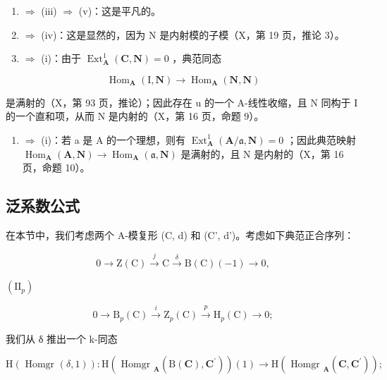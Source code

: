 \begin{enumerate}
\def\labelenumi{(\roman{enumi})}
\setcounter{enumi}{1}
\item
  \(\Rightarrow\) (iii) \(\Rightarrow\) (v)：这是平凡的。
\item
  \(\Rightarrow\) (iv)：这是显然的，因为 N 是内射模的子模（X，第 19 页，推论 3）。
\item
  \(\Rightarrow\) (i)：由于 \(\operatorname{Ext}_{\mathbf{A}}^{1}(\mathbf{C},\mathbf{N}) = 0\) ，典范同态
\end{enumerate}

\[
\operatorname{Hom} _ {\mathbf {A}} (\mathrm{I}, \mathbf {N}) \rightarrow \operatorname{Hom} _ {\mathbf {A}} (\mathbf {N}, \mathbf {N})
\]

是满射的（X，第 93 页，推论）；因此存在 u 的一个 A-线性收缩，且 N 同构于 I 的一个直和项，从而 N 是内射的（X，第 16 页，命题 9）。

\begin{enumerate}
\def\labelenumi{(\alph{enumi})}
\setcounter{enumi}{21}
\tightlist
\item
  \(\Rightarrow\) (i)：若 a 是 A 的一个理想，则有 \(\operatorname{Ext}_{\mathbf{A}}^{1}(\mathbf{A}/\mathfrak{a},\mathbf{N})=0\) ；因此典范映射 \(\operatorname{Hom}_{\mathbf{A}}(\mathbf{A},\mathbf{N})\to\operatorname{Hom}_{\mathbf{A}}(\mathfrak{a},\mathbf{N})\) 是满射的，且 N 是内射的（X，第 16 页，命题 10）。
\end{enumerate}

\subsection{泛系数公式}

在本节中，我们考虑两个 A-模复形 (C, d) 和 (C', d')。考虑如下典范正合序列：

\[
0 \rightarrow \mathrm{Z} (\mathrm{C}) \stackrel {{j}} {{\rightarrow}} \mathrm{C} \stackrel {{\delta}} {{\rightarrow}} \mathrm{B} (\mathrm{C}) (- 1) \rightarrow 0,\tag{I}
\]

\((\mathrm{II}_{p})\)

\[
0 \to \mathrm{B} _ {p} (\mathrm{C}) \stackrel {{i}} {{\to}} \mathrm{Z} _ {p} (\mathrm{C}) \stackrel {{p}} {{\to}} \mathrm{H} _ {p} (\mathrm{C}) \to 0;
\]

我们从 δ 推出一个 k-同态

\[
\mathrm{H} (\text { Homgr } (\delta , 1)): \mathrm{H} (\text { Homgr } _ {\mathbf {A}} (\mathrm{B} (\mathbf {C}), \mathbf {C} ^ {\prime})) (1) \rightarrow \mathrm{H} (\text { Homgr } _ {\mathbf {A}} (\mathbf {C}, \mathbf {C} ^ {\prime}));
\]

